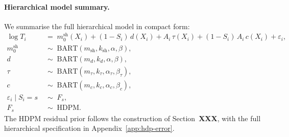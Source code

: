 \paragraph{Hierarchical model summary.}
We summarise the full hierarchical model in compact form:
\begin{align*}
\log T_i &\;=\; m_0^{\mathrm{sh}}(X_i) + (1 - S_i)\, d(X_i) + A_i\, \tau(X_i) + (1 - S_i)\, A_i\, c(X_i) + \varepsilon_i, \\
m_0^{\mathrm{sh}} &\;\sim\; \mathrm{BART}(m_{\mathrm{sh}}, k_{\mathrm{sh}}, \alpha, \beta), \\
d &\;\sim\; \mathrm{BART}(m_d, k_d, \alpha, \beta), \\
\tau &\;\sim\; \mathrm{BART}(m_\tau, k_\tau, \alpha_\tau, \beta_\tau), \\
c &\;\sim\; \mathrm{BART}(m_c, k_c, \alpha_c, \beta_c), \\
\varepsilon_i \mid S_i = s &\;\sim\; F_s, \\
F_s &\;\sim\; \mathrm{HDPM}.
\end{align*}
The HDPM residual prior follows the construction of Section~\textbf{XXX}, with the full hierarchical specification in Appendix~\ref{app:hdp-error}.

